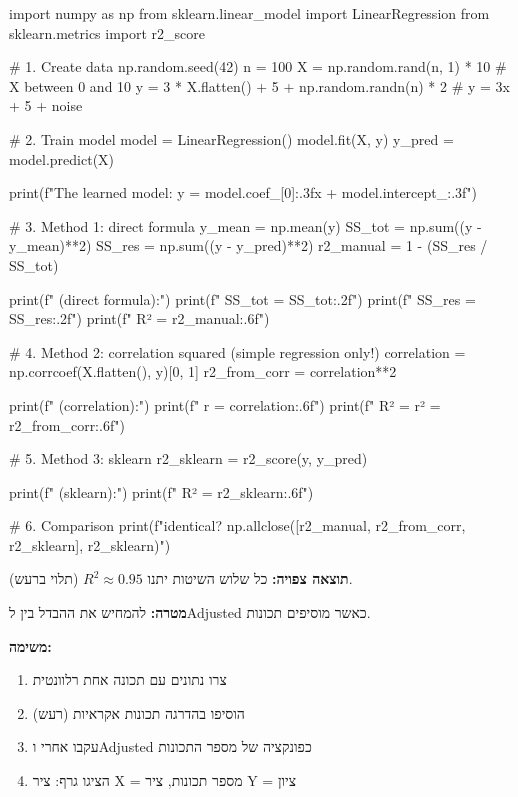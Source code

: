 \begin{pythonbox}
import numpy as np
from sklearn.linear_model import LinearRegression
from sklearn.metrics import r2_score

# 1. Create data
np.random.seed(42)
n = 100
X = np.random.rand(n, 1) * 10  # X between 0 and 10
y = 3 * X.flatten() + 5 + np.random.randn(n) * 2  # y = 3x + 5 + noise

# 2. Train model
model = LinearRegression()
model.fit(X, y)
y_pred = model.predict(X)

print(f"The learned model: y = {model.coef_[0]:.3f}x + {model.intercept_:.3f}")

# 3. Method 1: direct formula
y_mean = np.mean(y)
SS_tot = np.sum((y - y_mean)**2)
SS_res = np.sum((y - y_pred)**2)
r2_manual = 1 - (SS_res / SS_tot)

print(f" (direct formula):")
print(f"  SS_tot = {SS_tot:.2f}")
print(f"  SS_res = {SS_res:.2f}")
print(f"  R² = {r2_manual:.6f}")

# 4. Method 2: correlation squared (simple regression only!)
correlation = np.corrcoef(X.flatten(), y)[0, 1]
r2_from_corr = correlation**2

print(f" (correlation):")
print(f"  r = {correlation:.6f}")
print(f"  R² = r² = {r2_from_corr:.6f}")

# 5. Method 3: sklearn
r2_sklearn = r2_score(y, y_pred)

print(f" (sklearn):")
print(f"  R² = {r2_sklearn:.6f}")

# 6. Comparison
print(f"\nAll identical? {np.allclose([r2_manual, r2_from_corr, r2_sklearn], r2_sklearn)}")
\end{pythonbox}

\textbf{תוצאה צפויה:} כל שלוש השיטות יתנו $R^2 \approx \num{0.95}$ (תלוי ברעש).


\textbf{מטרה:} להמחיש את ההבדל בין \Rsquared{} ל\en{-}Adjusted \Rsquared{} כאשר מוסיפים תכונות.

\textbf{משימה:}

\begin{enumerate}
\item צרו נתונים עם תכונה אחת רלוונטית
\item הוסיפו בהדרגה תכונות אקראיות (רעש)
\item עקבו אחרי \Rsquared{} ו\en{-}Adjusted \Rsquared{} כפונקציה של מספר התכונות
\item הציגו גרף: ציר X = מספר תכונות, ציר Y = ציון
\end{enumerate}

